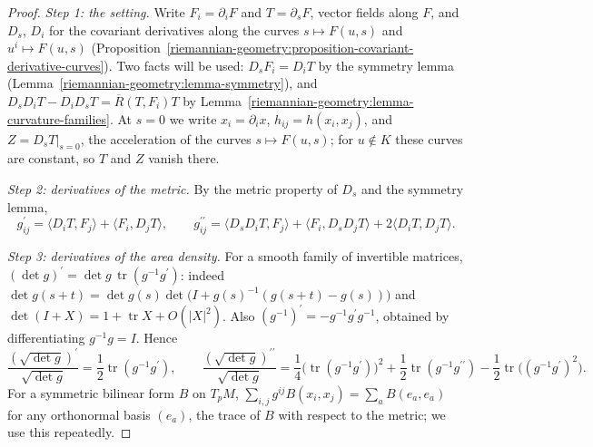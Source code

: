 \begin{proof}
\emph{Step 1: the setting.} Write $F_i = \partial_iF$ and $T = \partial_sF$, vector fields along $F$, and $D_s$, $D_i$ for the covariant derivatives along the curves
$s \mapsto F(u, s)$ and $u^i \mapsto F(u, s)$ (Proposition~\ref{riemannian-geometry:proposition-covariant-derivative-curves}). Two facts will be used: $D_sF_i = D_iT$ by the symmetry
lemma (Lemma~\ref{riemannian-geometry:lemma-symmetry}), and $D_sD_iT - D_iD_sT = \overline{R}(T, F_i)T$ by Lemma~\ref{riemannian-geometry:lemma-curvature-families}. At $s = 0$ we
write $x_i = \partial_ix$, $h_{ij} = h(x_i, x_j)$, and $Z = D_sT|_{s=0}$, the acceleration of the curves $s \mapsto F(u, s)$; for $u \notin K$ these curves are constant, so $T$ and $Z$
vanish there.

\emph{Step 2: derivatives of the metric.} By the metric property of $D_s$ and the symmetry lemma,
\[
g^{\prime}_{ij} = \langle D_iT, F_j\rangle + \langle F_i, D_jT\rangle, \qquad g^{\prime\prime}_{ij} = \langle D_sD_iT, F_j\rangle + \langle F_i, D_sD_jT\rangle + 2\langle D_iT, D_jT\rangle .
\]

\emph{Step 3: derivatives of the area density.} For a smooth family of invertible matrices, $(\det g)^{\prime} = \det g\,\operatorname{tr}(g^{-1}g^{\prime})$: indeed
$\det g(s + t) = \det g(s)\det\bigl(I + g(s)^{-1}(g(s + t) - g(s))\bigr)$ and $\det(I + X) = 1 + \operatorname{tr}X + O(|X|^2)$. Also $(g^{-1})^{\prime} = -g^{-1}g^{\prime}g^{-1}$,
obtained by differentiating $g^{-1}g = I$. Hence
\[
\frac{(\sqrt{\det g})^{\prime}}{\sqrt{\det g}} = \frac12\operatorname{tr}(g^{-1}g^{\prime}), \qquad
\frac{(\sqrt{\det g})^{\prime\prime}}{\sqrt{\det g}} = \frac14\bigl(\operatorname{tr}(g^{-1}g^{\prime})\bigr)^2 + \frac12\operatorname{tr}(g^{-1}g^{\prime\prime}) - \frac12\operatorname{tr}\bigl((g^{-1}g^{\prime})^2\bigr).
\]
For a symmetric bilinear form $B$ on $T_pM$, $\sum_{i,j}g^{ij}B(x_i, x_j) = \sum_aB(e_a, e_a)$ for any orthonormal basis $(e_a)$, the trace of $B$ with respect to the metric; we use
this repeatedly.


\end{proof}

